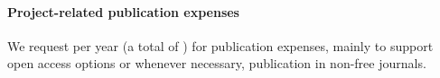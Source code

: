 \documentclass[10pt,fleqn,twoside]{article}
\begin{document}




\paragraph{Project-related publication expenses}


We request  per year (a total of ) for publication
expenses, mainly to support open access options or whenever necessary,
publication in non-free journals.











\end{document}
